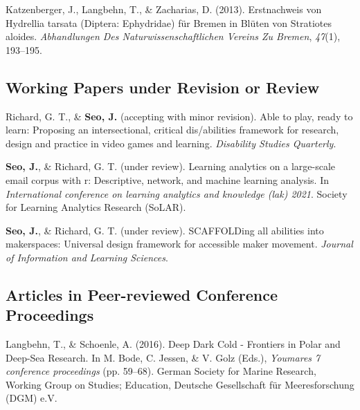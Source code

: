 \documentclass[11pt, a4paper]{awesome-cv}
\begin{document}
\leavevmode\hypertarget{ref-Katzenberger2013}{}%
Katzenberger, J., Langbehn, T., \& Zacharias, D. (2013). Erstnachweis
von Hydrellia tarsata (Diptera: Ephydridae) für Bremen in Blüten von
Stratiotes aloides. \emph{Abhandlungen Des Naturwissenschaftlichen
Vereins Zu Bremen}, \emph{47}(1), 193--195.

\hypertarget{working-papers-under-revision-or-review}{%
\subsection{Working Papers under Revision or
Review}\label{working-papers-under-revision-or-review}}

\hypertarget{refs_working_paper}{}
\leavevmode\hypertarget{ref-dsq}{}%
Richard, G. T., \& \textbf{Seo, J.} (accepting with minor revision).
Able to play, ready to learn: Proposing an intersectional, critical
dis/abilities framework for research, design and practice in video games
and learning. \emph{Disability Studies Quarterly}.

\leavevmode\hypertarget{ref-seo2021mboxr}{}%
\textbf{Seo, J.}, \& Richard, G. T. (under review). Learning analytics
on a large-scale email corpus with r: Descriptive, network, and machine
learning analysis. In \emph{International conference on learning
analytics and knowledge (lak) 2021}. Society for Learning Analytics
Research (SoLAR).

\leavevmode\hypertarget{ref-scaffold}{}%
\textbf{Seo, J.}, \& Richard, G. T. (under review). SCAFFOLDing all
abilities into makerspaces: Universal design framework for accessible
maker movement. \emph{Journal of Information and Learning Sciences}.

\hypertarget{articles-in-peer-reviewed-conference-proceedings}{%
\subsection{Articles in Peer-reviewed Conference
Proceedings}\label{articles-in-peer-reviewed-conference-proceedings}}

\hypertarget{refs_proceedings}{}
\leavevmode\hypertarget{ref-Langbehn2016c}{}%
Langbehn, T., \& Schoenle, A. (2016). Deep \textbar{} Dark \textbar{}
Cold - Frontiers in Polar and Deep-Sea Research. In M. Bode, C. Jessen,
\& V. Golz (Eds.), \emph{Youmares 7 conference proceedings} (pp.
59--68). German Society for Marine Research, Working Group on Studies;
Education, Deutsche Gesellschaft für Meeresforschung (DGM) e.V.
\end{document}
